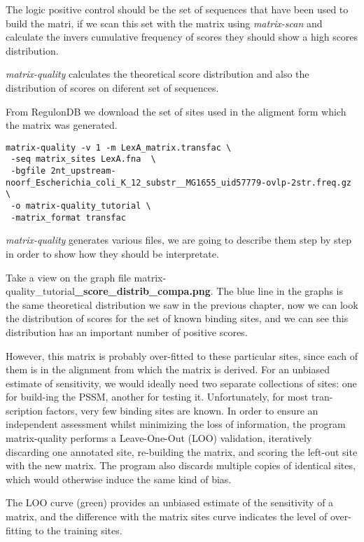 The logic positive control should be the set of sequences that have
been used to build the matri, if we scan this set with the matrix
using \textit{matrix-scan} and calculate the invers cumulative
frequency of scores they should show a high scores distribution.

\textit{matrix-quality} calculates the theoretical score distribution
and also the distribution of scores on diferent set of sequences.

From RegulonDB we download the set of sites used in the aligment form
which the matrix was generated.

{\color{Blue} 
  \begin{footnotesize}
\begin{verbatim}
matrix-quality -v 1 -m LexA_matrix.transfac \
 -seq matrix_sites LexA.fna  \
 -bgfile 2nt_upstream-noorf_Escherichia_coli_K_12_substr__MG1655_uid57779-ovlp-2str.freq.gz \
 -o matrix-quality_tutorial \
 -matrix_format transfac  

\end{verbatim} 
  \end{footnotesize} 
}

\textit{matrix-quality} generates various files, we are going to
describe them step by step in order to show how they should be
interpretate.

Take a view on the graph file
matrix-quality\_tutorial\textbf{\_score\_distrib\_compa.png}.  The
blue line in the graphs is the same theoretical distribution we saw in
the previous chapter, now we can look the distribution of scores for
the set of known binding sites, and we can see this distribution has
an important number of positive scores.

However, this matrix is probably over-fitted to these particular
sites, since each of them is in the alignment from which the matrix is
derived. For an unbiased estimate of sensitivity, we would ideally
need two separate collections of sites: one for build-ing the PSSM,
another for testing it. Unfortunately, for most tran-scription
factors, very few binding sites are known. In order to ensure an
independent assessment whilst minimizing the loss of information, the
program matrix-quality performs a Leave-One-Out (LOO) validation,
iteratively discarding one annotated site, re-building the matrix, and
scoring the left-out site with the new matrix. The program also
discards multiple copies of identical sites, which would otherwise
induce the same kind of bias.

The LOO curve (green) provides an unbiased estimate of the sensitivity
of a matrix, and the difference with the matrix sites curve indicates
the level of over-fitting to the training sites.


